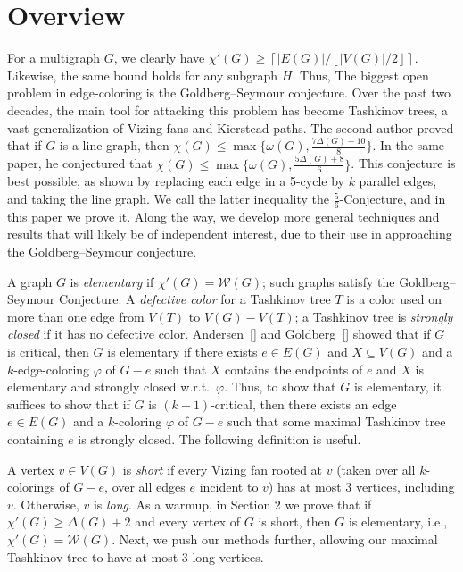 \documentclass[12pt]{amsart}
\theoremstyle{plain}
\theoremstyle{definition}
\theoremstyle{remark}
\newcommand{\fancy}[1]{\mathcal{#1}}
\newcommand{\W}{\fancy{W}}
\newcommand{\ceil}[1]{\left\lceil#1\right\rceil}
\newcommand{\floor}[1]{\left\lfloor#1\right\rfloor}
\newcommand{\vph}{\varphi}
\begin{document}
\section{Overview}

For a multigraph $G$, we clearly have $\chi'(G)\ge
\ceil{|E(G)|/\floor{|V(G)|/2}}$.  Likewise, the same bound holds for any
subgraph $H$.  Thus, 
The biggest open problem in edge-coloring is the Goldberg--Seymour conjecture.
Over the past two decades, the main tool for attacking this problem has become
Tashkinov trees, a vast generalization of Vizing fans and Kierstead paths.
The second author proved that if $G$ is a line graph, then $\chi(G)\le
\max\{\omega(G),\frac{7\Delta(G)+10}{8}\}$.  In the same paper, he conjectured
that $\chi(G)\le \max\{\omega(G),\frac{5\Delta(G)+8}{6}\}$. This conjecture is best
possible, as shown by replacing each edge in a 5-cycle by $k$ parallel edges,
and taking the line graph.
We call the latter inequality the $\frac56$-Conjecture, and in this paper we prove
it.  Along the way, we develop more general techniques and results that will
likely be of independent interest, due to their use in approaching the
Goldberg--Seymour conjecture.

A graph $G$ is \emph{elementary} if $\chi'(G)=\W(G)$; such graphs satisfy the
Goldberg--Seymour Conjecture.  
A
\emph{defective color}
for a Tashkinov tree $T$ is a color used on more than one edge from $V(T)$ to
$V(G)-V(T)$; a Tashkinov tree is \emph{strongly closed} if it has no defective
color.  Andersen~[] and Goldberg~[] showed that if $G$ is critical, then $G$ is
elementary if there exists $e\in E(G)$ and $X\subseteq V(G)$ and a
$k$-edge-coloring $\vph$ of $G-e$ such that $X$ contains the endpoints of $e$
and $X$ is elementary and strongly closed w.r.t.~$\vph$.  Thus, to show that $G$
is elementary, it suffices to show that if $G$ is $(k+1)$-critical, then there
exists an edge $e\in E(G)$ and a $k$-coloring $\vph$ of $G-e$ such that some
maximal Tashkinov tree containing $e$ is strongly closed.  The following
definition is useful.  

A vertex $v \in V(G)$ is \emph{short} if every Vizing fan rooted at $v$ (taken over all
$k$-colorings of $G-e$, over all edges $e$ incident to $v$) has at most 3 vertices,
including $v$.  Otherwise, $v$ is \emph{long}.
As a warmup, in Section 2 we prove that if $\chi'(G)\ge \Delta(G)+2$ and every
vertex of $G$ is short, then $G$ is elementary, i.e., $\chi'(G)=\W(G)$.  Next,
we push our methods further, allowing our maximal Tashkinov tree to have at most
3 long vertices.
\end{document}
